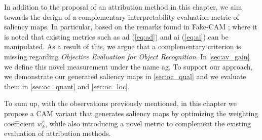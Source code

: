 \noindent In addition to the proposal of an attribution method in this chapter, we aim towards the 
design of a complementary interpretability evaluation metric of saliency maps. In particular, 
based on the remarks found in Fake-CAM \autocite{poppi2021revisiting}; where it is noted that 
existing metrics such as \gls{ad} (\ref{eq:ad}) and \gls{ai} (\ref{eq:ai}) can be manipulated. As a 
result of this, we argue that a complementary criterion is missing regarding \textit{Objective 
Evaluation for Object Recognition}. In \autoref{sec:av_gain} we define this novel measurement 
under the name \gls{ag}. To support our approach, we demonstrate our generated saliency maps in 
\autoref{sec:oc_qual} and we evaluate them in \autoref{sec:oc_quant} and \autoref{sec:oc_loc}.

\noindent To sum up, with the observations previously mentioned, in this chapter we propose a CAM 
variant that generates saliency maps by optimizing the weighting coefficient $w_k^c$, while also 
introducing a novel metric to complement the existing evaluation of attribution methods.\\








